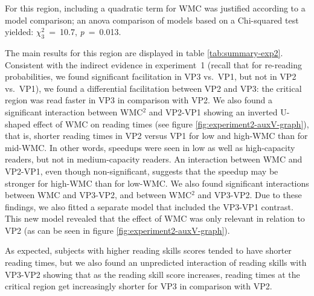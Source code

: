 \documentclass{frontiersSCNS}\usepackage{knitr}
\begin{document}
For this region, including a quadratic term for WMC was justified according to a model comparison; an anova comparison of  models based on a Chi-squared test yielded: $\chi^2_3$~=~10.7, \textit{p}~=~0.013. 

The main results for this region are displayed in table \ref{tab:summary-exp2}. Consistent with the indirect evidence in experiment~1 (recall that for re-reading probabilities, we found significant facilitation in VP3 vs.\ VP1, but not  in VP2 vs.\ VP1), 
we found a differential facilitation between VP2 and VP3: the critical region was read faster in VP3 in comparison with VP2. We also found a significant interaction between WMC$^2$ and VP2-VP1 showing an inverted U-shaped effect of WMC on reading times (see figure \ref{fig:experiment2-auxV-graph}), that is, shorter reading times in  VP2 versus VP1 for low and high-WMC than
for mid-WMC. In other words, speedups were seen in low as well as high-capacity readers, but not in medium-capacity readers.
An interaction between WMC and VP2-VP1, even though non-significant, suggests that the speedup may be stronger for high-WMC than for low-WMC. We also found significant interactions between WMC and VP3-VP2, and between WMC$^2$ and VP3-VP2. Due to these findings, we also fitted a separate model that included the VP3-VP1 contrast. This new model revealed that the effect of WMC was only  relevant in relation to VP2 (as can be seen in figure \ref{fig:experiment2-auxV-graph}).


As expected, subjects with higher reading skills scores tended to have shorter reading times, but we also found an unpredicted interaction of  reading skills with VP3-VP2 showing that as the reading skill score increases, reading times at the critical region get increasingly shorter for VP3 in comparison with VP2.
\end{document}
